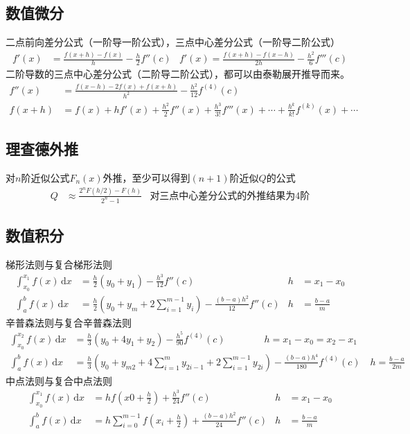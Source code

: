 \documentclass[twocolumn]{article}
\begin{document}
\subsection{数值微分}
二点前向差分公式（一阶导一阶公式），三点中心差分公式（一阶导二阶公式）
\begin{align*}
    f'(x) & =\frac{f(x+h)-f(x)}{h}-\frac{h}{2}f''(c) & f'(x)=\frac{f(x+h)-f(x-h)}{2h}-\frac{h^2}{6}f'''(c)
\end{align*}
二阶导数的三点中心差分公式（二阶导二阶公式），都可以由泰勒展开推导而来。
\begin{align*}
    f''(x) & =\frac{f(x-h)-2f(x)+f(x+h)}{h^2}-\frac{h^2}{12}f^{(4)}(c)                                     \\
    f(x+h) & =f(x)+hf'(x)+\frac{h^2}{2}f''(x)+\frac{h^3}{3!}f'''(x)+\cdots+\frac{h^k}{k!}f^{(k)}(x)+\cdots
\end{align*}

\subsection{理查德外推}
对$n$阶近似公式$F_n(x)$外推，至少可以得到$(n+1)$阶近似$Q$的公式
\begin{align*}
    Q &\approx \frac{2^nF(h/2)-F(h)}{2^n-1} & \text{对三点中心差分公式的外推结果为4阶}
\end{align*}

\subsection{数值积分}
梯形法则与复合梯形法则
\begin{align*}
    \int_{x_0}^{x_1} f(x) \,\mathrm{d}x & = \frac{h}{2}(y_0+y_1)-\frac{h^3}{12}f''(c)                           & h & =x_1-x_0       \\
    \int_{a}^{b} f(x) \,\mathrm{d}x     & = \frac{h}{2}(y_0+y_m+2\sum_{i=1}^{m-1}y_i)-\frac{(b-a)h^2}{12}f''(c) & h & =\frac{b-a}{m}
\end{align*}
辛普森法则与复合辛普森法则
\begin{align*}
    \int_{x_0}^{x_2} f(x) \,\mathrm{d}x & = \frac{h}{3}(y_0+4y_1+y_2)-\frac{h^5}{90}f^{(4)}(c) \qquad \qquad h=x_1-x_0=x_2-x_1                                            \\
    \int_{a}^{b} f(x) \,\mathrm{d}x     & = \frac{h}{3}(y_0+y_{m2}+4\sum_{i=1}^{m}y_{2i-1}+2\sum_{i=1}^{m-1}y_{2i})-\frac{(b-a)h^4}{180}f^{(4)}(c) \quad h=\frac{b-a}{2m}
\end{align*}
中点法则与复合中点法则
\begin{align*}
    \int_{x_0}^{x_1} f(x) \,\mathrm{d}x & =hf(x0+\frac{h}{2})+\frac{h^3}{24}f''(c)                       & h & =x_1-x_0       \\
    \int_{a}^{b} f(x) \,\mathrm{d}x     & =h\sum_{i=0}^{m-1}f(x_i+\frac{h}{2})+\frac{(b-a)h^2}{24}f''(c) & h & =\frac{b-a}{m}
\end{align*}
\end{document}

